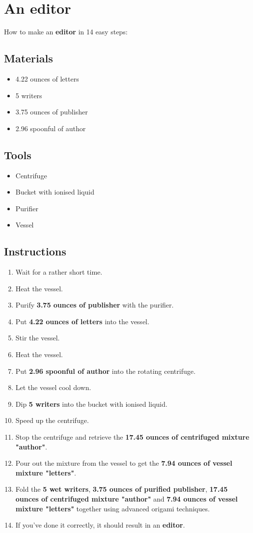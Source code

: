 \documentclass{article}
\begin{document}
\section{An editor}How to make an \textbf{editor} in 14 easy steps:

\subsection{Materials}\begin{itemize}
\item 
4.22 ounces of letters
\item 
5 writers
\item 
3.75 ounces of publisher
\item 
2.96 spoonful of author
\end{itemize}
\subsection{Tools}\begin{itemize}
\item 
Centrifuge
\item 
Bucket with ionised liquid
\item 
Purifier
\item 
Vessel
\end{itemize}
\subsection{Instructions}\begin{enumerate}
\item 
Wait for a rather short time.
\item 
Heat the vessel.
\item 
Purify \textbf{3.75 ounces of publisher} with the purifier.
\item 
Put \textbf{4.22 ounces of letters} into the vessel.
\item 
Stir the vessel.
\item 
Heat the vessel.
\item 
Put \textbf{2.96 spoonful of author} into the rotating centrifuge.
\item 
Let the vessel cool down.
\item 
Dip \textbf{5 writers} into the bucket with ionised liquid.
\item 
Speed up the centrifuge.
\item 
Stop the centrifuge and retrieve the \textbf{17.45 ounces of centrifuged mixture "author"}.
\item 
Pour out the mixture from the vessel to get the \textbf{7.94 ounces of vessel mixture "letters"}.
\item 
Fold the \textbf{5 wet writers}, \textbf{3.75 ounces of purified publisher}, \textbf{17.45 ounces of centrifuged mixture "author"} and \textbf{7.94 ounces of vessel mixture "letters"} together using advanced origami techniques.
\item 
If you've done it correctly, it should result in an \textbf{editor}.
\end{enumerate}
\newpage
\end{document}
